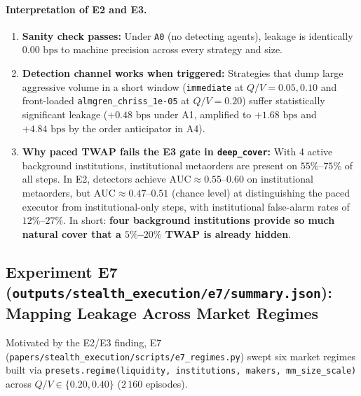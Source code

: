 \documentclass[11pt,a4paper]{article}
\newcommand{\code}[1]{\texttt{#1}}
\begin{document}
\paragraph{Interpretation of E2 and E3.}
\begin{enumerate}[nosep]
\item \textbf{Sanity check passes:} Under \code{A0} (no detecting agents), leakage is identically
  $0.00\text{ bps}$ to machine precision across every strategy and size.
\item \textbf{Detection channel works when triggered:} Strategies that dump large aggressive volume in a
  short window (\code{immediate} at $Q/V = 0.05, 0.10$ and front-loaded \code{almgren\_chriss\_1e-05} at
  $Q/V = 0.20$) suffer statistically significant leakage ($+0.48\text{ bps}$ under A1, amplified to
  $+1.68\text{ bps}$ and $+4.84\text{ bps}$ by the order anticipator in A4).
\item \textbf{Why paced TWAP fails the E3 gate in \code{deep\_cover}:} With 4 active background
  institutions, institutional metaorders are present on $55\%$--$75\%$ of all steps. In E2, detectors
  achieve $\text{AUC} \approx 0.55$--$0.60$ on institutional metaorders, but $\text{AUC} \approx 0.47$--$0.51$
  (chance level) at distinguishing the paced executor from institutional-only steps, with institutional
  false-alarm rates of $12\%$--$27\%$. In short: \textbf{four background institutions provide so much
  natural cover that a $5\%$--$20\%$ TWAP is already hidden}.
\end{enumerate}

\subsection{Experiment E7 (\code{outputs/stealth\_execution/e7/summary.json}): Mapping Leakage Across Market Regimes}

Motivated by the E2/E3 finding, E7 (\code{papers/stealth\_execution/scripts/e7\_regimes.py}) swept six market regimes built via
\code{presets.regime(liquidity, institutions, makers, mm\_size\_scale)} across $Q/V \in \{0.20, 0.40\}$
($2\,160$ episodes).
\end{document}
